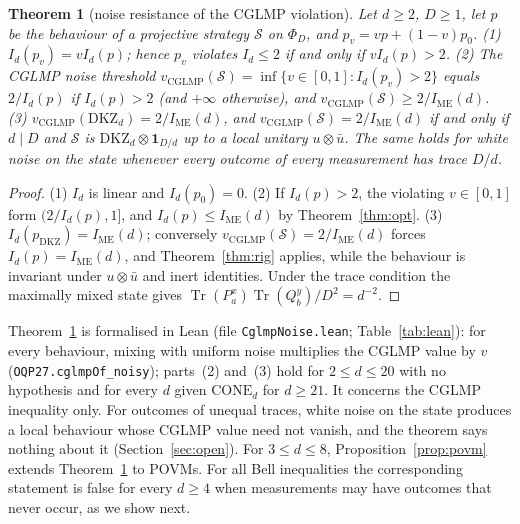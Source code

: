 \documentclass[11pt]{article}
\newtheorem{theorem}{Theorem}
\theoremstyle{remark}
\numberwithin{equation}{section}
\newcommand{\Tr}{\operatorname{Tr}}
\newcommand{\IME}{I_{\mathrm{ME}}}
\newcommand{\one}{\mathbf{1}}
\newcommand{\DKZ}{\mathrm{DKZ}}
\newcommand{\CONE}{\mathrm{CONE}}
\begin{document}
\begin{theorem}[noise resistance of the CGLMP violation]\label{thm:noisecglmp}
Let $d\ge2$, $D\ge1$, let $p$ be the behaviour of a projective strategy $\mathcal S$ on $\Phi_D$, and
$p_v=vp+(1-v)p_0$. \textup{(1)} $I_d(p_v)=vI_d(p)$; hence $p_v$ violates $I_d\le2$ if and only if $vI_d(p)>2$.
\textup{(2)} The CGLMP noise threshold $v_{\mathrm{CGLMP}}(\mathcal S)=\inf\{v\in[0,1]:I_d(p_v)>2\}$ equals $2/I_d(p)$
if $I_d(p)>2$ \textup{(}and $+\infty$ otherwise\textup{)}, and $v_{\mathrm{CGLMP}}(\mathcal S)\ge2/\IME(d)$.
\textup{(3)} $v_{\mathrm{CGLMP}}(\DKZ_d)=2/\IME(d)$, and $v_{\mathrm{CGLMP}}(\mathcal S)=2/\IME(d)$ if and only if $d\mid
D$ and $\mathcal S$ is $\DKZ_d\otimes\one_{D/d}$ up to a local unitary $u\otimes\bar u$. The same holds for white noise
on the state whenever every outcome of every measurement has trace $D/d$.
\end{theorem}

\begin{proof}
(1) $I_d$ is linear and $I_d(p_0)=0$. (2) If $I_d(p)>2$, the violating $v\in[0,1]$ form $(2/I_d(p),1]$, and
$I_d(p)\le\IME(d)$ by Theorem~\ref{thm:opt}. (3) $I_d(p_{\DKZ})=\IME(d)$; conversely
$v_{\mathrm{CGLMP}}(\mathcal S)=2/\IME(d)$ forces $I_d(p)=\IME(d)$, and Theorem~\ref{thm:rig} applies, while the behaviour
is invariant under $u\otimes\bar u$ and inert identities. Under the trace condition the maximally mixed state gives
$\Tr(P^x_a)\Tr(Q^y_b)/D^2=d^{-2}$.
\end{proof}

Theorem~\ref{thm:noisecglmp} is formalised in Lean (file \texttt{CglmpNoise.lean}; Table~\ref{tab:lean}): for every
behaviour, mixing with uniform noise multiplies the CGLMP value by $v$ (\nolinkurl{OQP27.cglmpOf_noisy}); parts~(2)
and~(3) hold for $2\le d\le20$ with no hypothesis and for every $d$ given $\CONE_d$ for $d\ge21$. It concerns the CGLMP
inequality only. For outcomes of unequal traces, white noise on the state produces a local behaviour whose CGLMP value
need not vanish, and the theorem says nothing about it (Section~\ref{sec:open}). For $3\le d\le8$,
Proposition~\ref{prop:povm} extends Theorem~\ref{thm:noisecglmp} to POVMs. For all Bell inequalities the corresponding
statement is false for every $d\ge4$ when measurements may have outcomes that never occur, as we show next.
\end{document}
